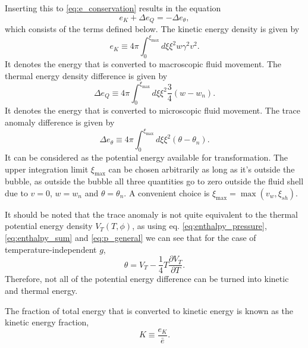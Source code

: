 Inserting this to \eqref{eq:e_conservation} results in the equation \cite[eq. B.24]{hindmarsh_gw_pt_2019}
\begin{equation}
e_K + \Delta e_Q = - \Delta e_\theta,
\end{equation}
which consists of the terms defined below.
The kinetic energy density is given by
\begin{equation}
e_K \equiv 4 \pi \int_0^{\xi_\text{max}} d\xi \xi^2 w \gamma^2 v^2.
\label{eq:kinetic_energy_density}
\end{equation}
It denotes the energy that is converted to macroscopic fluid movement.
The thermal energy density difference is given by
\begin{equation}
\Delta e_Q \equiv 4 \pi \int_0^{\xi_\text{max}} d\xi \xi^2 \frac{3}{4} (w - w_n).
\label{eq:thermal_energy_density}
\end{equation}
It denotes the energy that is converted to microscopic fluid movement.
The trace anomaly difference is given by
\begin{equation}
\Delta e_\theta \equiv 4 \pi \int_0^{\xi_\text{max}} d\xi \xi^2 (\theta - \theta_n).
\end{equation}
It can be considered as the potential energy available for transformation.
The upper integration limit $\xi_\text{max}$ can be chosen arbitrarily as long as it's outside the bubble, as outside the bubble all three quantities go to zero outside the fluid shell due to $v=0$, $w=w_n$ and $\theta = \theta_n$.
A convenient choice is $\xi_\text{max} = \max (v_w, \xi_{sh})$.
\cite[eq. B.25]{hindmarsh_gw_pt_2019}

It should be noted that the trace anomaly is not quite equivalent to the thermal potential energy density $V_T(T,\phi)$, as using eq. \eqref{eq:enthalpy_pressure}, \eqref{eq:enthalpy_sum} and \eqref{eq:p_general} we can see that for the case of temperature-independent $g$,
\begin{equation}
\theta = V_T - \frac{1}{4} T \frac{\partial V_T}{\partial T}.
\end{equation}
Therefore, not all of the potential energy difference can be turned into kinetic and thermal energy.
\cite[ch. B.2]{hindmarsh_gw_pt_2019}

The fraction of total energy that is converted to kinetic energy is known as the kinetic energy fraction,
\begin{equation}
K \equiv \frac{e_K}{\bar{e}}.
\label{eq:kinetic_energy_fraction}
\end{equation}

